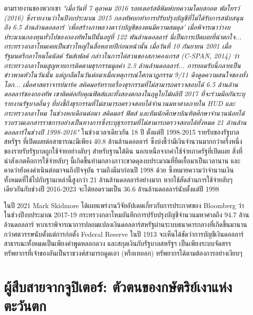 \documentclass[10pt,twocolumn,letterpaper]{article}
\begin{document}
ตามรายงานของพวกเขา \textit{"เมื่อวันที่ 7 ตุลาคม 2016 รอยเตอร์สตีพิมพ์บทความโดยสกอต พัลโทรว์ (2016) ซึ่งรายงานว่าในปีงบประมาณ 2015 กองทัพบกทำการปรับปรุงบัญชีที่ไม่ได้รับการสนับสนุนถึง 6.5 ล้านล้านดอลลาร์ 'เพื่อสร้างภาพลวงตาว่าบัญชีของตนมีความสมดุล' เมื่อพิจารณาว่างบประมาณกองทุนทั่วไปของกองทัพในปีนั้นอยู่ที่ 122 พันล้านดอลลาร์ นี่เป็นการเปิดเผยที่น่าตกใจ... กระทรวงกลาโหมเคยเป็นข่าวใหญ่ในสื่อหลายปีก่อนหน้านั้น เมื่อวันที่ 10 กันยายน 2001 เมื่อรัฐมนตรีกลาโหมโดนัลด์ รัมส์เฟลด์ กล่าวในการไต่สวนของสภาคองเกรส (C-SPAN, 2014) ว่ากระทรวงกลาโหมสูญหายการติดตามธุรกรรมมูลค่า 2.3 ล้านล้านดอลลาร์... การยอมรับนี้กลายเป็นข่าวพาดหัวในวันนั้น แต่ถูกลืมในวันต่อมาเมื่อเหตุการณ์โศกนาฏกรรม 9/11 ดึงดูดความสนใจของทั้งโลก... เมื่อศาสตราจารย์มาร์ค สคิดมอร์ทราบเรื่องธุรกรรมที่ไม่สามารถตรวจสอบได้ 6.5 ล้านล้านดอลลาร์ของกองทัพ เขาติดต่อกับคุณฟิตส์และทั้งสองตกลงในฤดูใบไม้ผลิปี 2017 ที่จะร่วมมือกันระบุรายงานรัฐบาลอื่นๆ ที่บ่งชี้ถึงธุรกรรมที่ไม่สามารถตรวจสอบได้จำนวนมหาศาลภายใน HUD และกระทรวงกลาโหม ในช่วงหกเดือนต่อมา สคิดมอร์ ฟิตส์ และทีมนักศึกษาบัณฑิตศึกษาจำนวนน้อยได้รวบรวมเอกสารราชการอย่างเป็นทางการซึ่งระบุธุรกรรมที่ไม่สามารถตรวจสอบได้ทั้งหมด 21 ล้านล้านดอลลาร์ในช่วงปี 1998-2016"} \cite{12}
ในช่วงเวลาเดียวกัน 18 ปี ตั้งแต่ปี 1998-2015 รายรับของรัฐบาลสหรัฐฯ ที่เปิดเผยต่อสาธารณะมีเพียง 40.8 ล้านล้านดอลลาร์ \cite{15} ซึ่งบ่งชี้ว่ามีเงินจำนวนมากกว่าครึ่งหนึ่งของรายรับรัฐบาลถูกใช้จ่ายอย่างลับๆ สำหรับฐานใต้ดิน นอกเหนือจากค่าใช้จ่ายภาครัฐที่เปิดเผย สิ่งที่น่าสังเกตคือการใช้จ่ายลับๆ นี้เกิดขึ้นท่ามกลางภาวะขาดดุลงบประมาณที่ยืดเยื้อมาเป็นเวลานาน และคาดว่ายังคงดำเนินต่อมาจนถึงปัจจุบัน รวมถึงมีมาก่อนปี 1998 ด้วย ซึ่งหมายความว่าจำนวนเงินทั้งหมดที่ใช้ไปกับฐานเหล่านี้สูงกว่า 21 ล้านล้านดอลลาร์อย่างมาก หากใช้สัดส่วนการใช้จ่ายลับๆ เดียวกันกับช่วงปี 2016-2023 จะได้ยอดรวมเป็น 36.6 ล้านล้านดอลลาร์นับตั้งแต่ปี 1998

ในปี 2021 Mark Skidmore ได้เผยแพร่งานวิจัยอัปเดตเกี่ยวกับการประกาศของ Bloomberg ว่าในช่วงปีงบประมาณ 2017-19 กระทรวงกลาโหมบันทึกการปรับปรุงบัญชีจำนวนมหาศาลถึง 94.7 ล้านล้านดอลลาร์ \cite{17,18} หากเราพิจารณาการปลอมแปลงเงินดอลลาร์สหรัฐผ่านระบบธนาคารกลางที่เกิดขึ้นมานานกว่าศตวรรษนับตั้งแต่การก่อตั้ง Federal Reserve ในปี 1913 \cite{37} จะเห็นได้ชัดว่าการบัญชีเงินดอลลาร์สาธารณะทั้งหมดเป็นเพียงคำพูดหลอกลวง และสกุลเงินกับรัฐบาลสหรัฐฯ เป็นเพียงระบบจัดสรรทรัพยากรที่เจ้าของอันเป็นราชวงศ์สามารถดูดเอา (หรือเทออก) ทรัพยากรได้ตามต้องการอย่างเงียบๆ
\section{ผู้สืบสายจากจูปิเตอร์: ตัวตนของกษัตริย์เงาแห่งตะวันตก}
\end{document}
